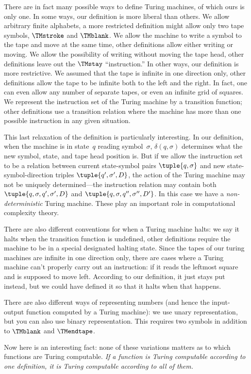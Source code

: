 \documentclass[../../../include/open-logic-section]{subfiles}
\begin{document}

There are in fact many possible ways to define Turing machines, of
which ours is only one.  In some ways, our definition is more liberal
than others. We allow arbitrary finite alphabets, a more restricted
definition might allow only two tape symbols, $\TMstroke$ and
$\TMblank$.  We allow the machine to write a symbol to the tape and
move at the same time, other definitions allow either writing or
moving.  We allow the possibility of writing without moving the tape
head, other definitions leave out the $\TMstay$ ``instruction.''  In
other ways, our definition is more restrictive. We assumed that the
tape is infinite in one direction only, other definitions allow the
tape to be infinite both to the left and the right. In fact, one can
even allow any number of separate tapes, or even an infinite grid
of squares.  We represent the instruction set of the Turing machine by
a transition function; other definitions use a transition relation
where the machine has more than one possible instruction in any given
situation.

This last relaxation of the definition is particularly interesting.
In our definition, when the machine is in state~$q$ reading
symbol~$\sigma$, $\delta(q, \sigma)$ determines what the new symbol,
state, and tape head position is.  But if we allow the instruction set
to be a relation between current state-symbol pairs $\tuple{q,
  \sigma}$ and new state-symbol-direction triples $\tuple{q', \sigma',
  D}$, the action of the Turing machine may not be uniquely
determined---the instruction relation may contain both $\tuple{q,
  \sigma, q', \sigma', D}$ and $\tuple{q, \sigma, q'', \sigma'', D'}$.
In this case we have a \emph{non-deterministic} Turing machine.  These
play an important role in computational complexity theory.

There are also different conventions for when a Turing machine halts:
we say it halts when the transition function is undefined, other
definitions require the machine to be in a special designated halting
state. Since the tapes of our turing machines are infinite in one
direction only, there are cases where a Turing machine can't properly
carry out an instruction: if it reads the leftmost square and is
supposed to move left. According to our definition, it just stays put
instead, but we could have defined it so that it halts when that
happens.

There are also different ways of representing numbers (and hence the
input-output function computed by a Turing machine): we use unary
representation, but you can also use binary representation. This
requires two symbols in addition to $\TMblank$ and $\TMendtape$.

Now here is an interesting fact: none of these variations matters as
to which functions are Turing computable. \emph{If a function is Turing
computable according to one definition, it is Turing computable
according to all of them.}  
\end{document}
